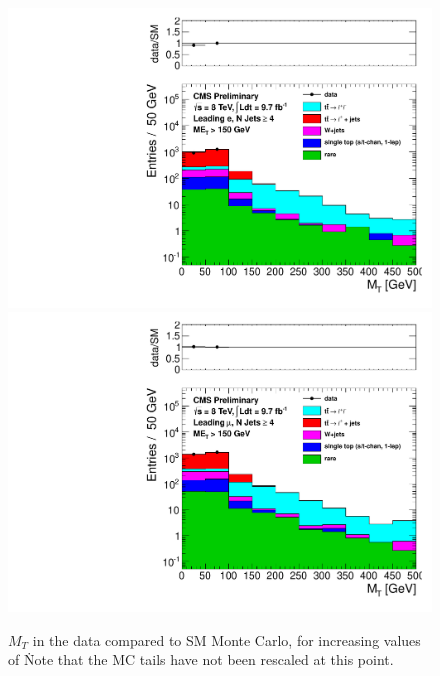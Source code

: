 \begin{figure}[hbt]
\begin{center}
        \includegraphics[width=0.5\linewidth]{plots/mt_met150_ele.pdf}%
        \includegraphics[width=0.5\linewidth]{plots/mt_met150_muo.pdf}

    \caption{$M_T$ in the data compared to SM Monte Carlo, for
      increasing values of \met\.  Note that the MC tails have not
      been rescaled at this point.
\label{fig:mtsig1}
}  
      \end{center}
\end{figure}

